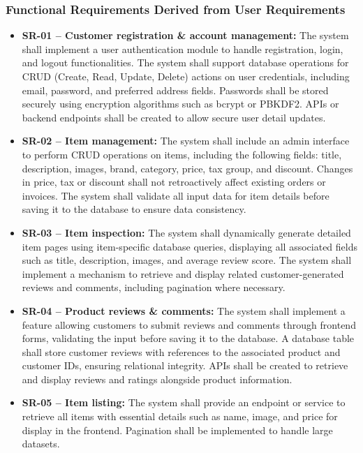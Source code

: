 \documentclass[a4paper,journal]{IEEEtran}
\begin{document}
\subsubsection{Functional Requirements Derived from User Requirements}
\begin{itemize}
  \item \textbf{SR-01 -- Customer registration \& account management:}
  The system shall implement a user authentication module to
  handle registration, login, and logout functionalities. The system shall
  support database operations for CRUD (Create, Read, Update, Delete) actions on
  user credentials, including email, password, and preferred address fields. Passwords
  shall be stored securely using encryption algorithms such as bcrypt or PBKDF2. APIs
  or backend endpoints shall be created to allow secure user detail updates.
  \item \textbf{SR-02 -- Item management:}
  The system shall include
  an admin interface to perform CRUD operations on items, including the following
  fields: title, description, images, brand, category, price, tax group, and
  discount. Changes in price, tax or discount shall not retroactively affect
  existing orders or invoices. The system shall validate all input data for item
  details before saving it to the database to ensure data consistency.
  \item \textbf{SR-03 -- Item inspection:}
  The system shall
  dynamically generate detailed item pages using item-specific database queries,
  displaying all associated fields such as title, description, images, and
  average review score. The system shall implement a mechanism to retrieve and
  display related customer-generated reviews and comments, including pagination
  where necessary.
  \item \textbf{SR-04 -- Product reviews \& comments:} The
  system shall implement a feature allowing customers to submit reviews and
  comments through frontend forms, validating the input before saving it to the
  database. A database table shall store customer reviews with references to the
  associated product and customer IDs, ensuring relational integrity. APIs shall
  be created to retrieve and display reviews and ratings alongside product
  information.
  \item \textbf{SR-05 -- Item listing:} The system shall provide an
  endpoint or service to retrieve all items with essential details such as name,
  image, and price for display in the frontend. Pagination shall be implemented
  to handle large datasets.

\end{itemize}
\end{document}
